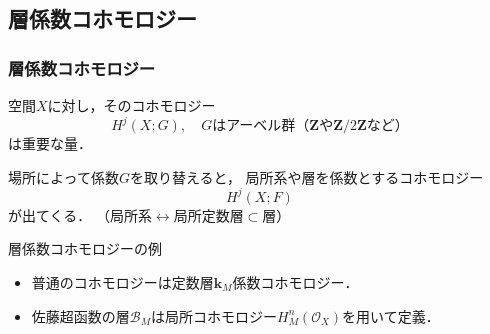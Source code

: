\documentclass[dvipdfmx,10pt,aspectratio=169,leqno]{beamer}%
\newcommand{\zz}{\mathbf{Z}}
\newcommand{\kk}{\mathbf{k}}
\newcommand{\mcal}{\mathcal}
\numberwithin{equation}{subsection}
\newcommand{\cB}{\mcal{B}}
\newcommand{\cO}{\mcal{O}}
\theoremstyle{mystyle}
\begin{document}
\subsection{層係数コホモロジー}

\begin{frame}
  \frametitle{層係数コホモロジー}
  空間\(X\)に対し，そのコホモロジー
  \[
      H^{j}(X;G),\quad\text{\(G\)はアーベル群（\(\zz\)や\(\zz/2\zz\)など）}
  \]は重要な量．\pause
  
  場所によって係数\(G\)を取り替えると，
  局所系や層を係数とするコホモロジー
  \[
      H^{j}(X;F)
  \]が出てくる．
  （\(
      \text{局所系}
      \leftrightarrow
      \text{局所定数層}
      \subset\text{層}
  \)）\pause
  \begin{exampleblock}{層係数コホモロジーの例}
    \begin{itemize}
      \item 普通のコホモロジーは定数層\(\kk_M\)係数コホモロジー．
      \item 佐藤超函数の層\(\cB_M\)は局所コホモロジー\(H^{n}_{M}(\cO_X)\)を用いて定義．
    \end{itemize}
  \end{exampleblock}

\end{frame}
\end{document}
